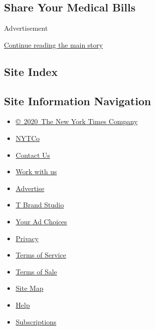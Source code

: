 \hypertarget{share-your-medical-bills}{%
\subsection{Share Your Medical Bills}\label{share-your-medical-bills}}

Advertisement

\protect\hyperlink{after-bottom}{Continue reading the main story}

\hypertarget{site-index}{%
\subsection{Site Index}\label{site-index}}

\hypertarget{site-information-navigation}{%
\subsection{Site Information
Navigation}\label{site-information-navigation}}

\begin{itemize}
\tightlist
\item
  \href{https://help.nytimes.com/hc/en-us/articles/115014792127-Copyright-notice}{©~2020~The
  New York Times Company}
\end{itemize}

\begin{itemize}
\tightlist
\item
  \href{https://www.nytco.com/}{NYTCo}
\item
  \href{https://help.nytimes.com/hc/en-us/articles/115015385887-Contact-Us}{Contact
  Us}
\item
  \href{https://www.nytco.com/careers/}{Work with us}
\item
  \href{https://nytmediakit.com/}{Advertise}
\item
  \href{http://www.tbrandstudio.com/}{T Brand Studio}
\item
  \href{https://www.nytimes.com/privacy/cookie-policy\#how-do-i-manage-trackers}{Your
  Ad Choices}
\item
  \href{https://www.nytimes.com/privacy}{Privacy}
\item
  \href{https://help.nytimes.com/hc/en-us/articles/115014893428-Terms-of-service}{Terms
  of Service}
\item
  \href{https://help.nytimes.com/hc/en-us/articles/115014893968-Terms-of-sale}{Terms
  of Sale}
\item
  \href{https://spiderbites.nytimes.com}{Site Map}
\item
  \href{https://help.nytimes.com/hc/en-us}{Help}
\item
  \href{https://www.nytimes.com/subscription?campaignId=37WXW}{Subscriptions}
\end{itemize}
